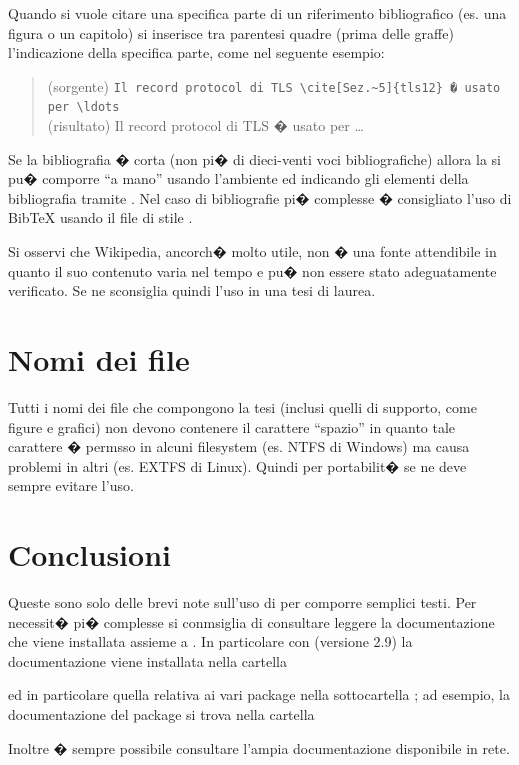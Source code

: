 Quando si vuole citare una specifica parte di un riferimento bibliografico (es. una figura o un capitolo) si inserisce tra parentesi quadre (prima delle graffe) l'indicazione della specifica parte, come nel seguente esempio:
\begin{quote}
(sorgente) \verb+Il record protocol di TLS \cite[Sez.~5]{tls12} � usato per \ldots+
\\
(risultato) Il record protocol di TLS \cite[Sez.~5]{tls12} � usato per \ldots
\end{quote}

Se la bibliografia � corta (non pi� di dieci-venti voci bibliografiche) allora la si pu� comporre ``a mano'' usando l'ambiente  ed indicando gli elementi della bibliografia tramite .
Nel caso di bibliografie pi� complesse � consigliato l'uso di BibTeX usando il file di stile .

Si osservi che Wikipedia, ancorch� molto utile, non � una fonte attendibile in quanto il suo contenuto varia nel tempo e pu� non essere stato adeguatamente verificato.
Se ne sconsiglia quindi l'uso in una tesi di laurea.


\section{Nomi dei file}
Tutti i nomi dei file che compongono la tesi (inclusi quelli di supporto, come figure e grafici) non devono contenere il carattere ``spazio'' in quanto tale carattere � permsso in alcuni filesystem (es. NTFS di Windows) ma causa problemi in altri (es. EXTFS di Linux).
Quindi per portabilit� se ne deve sempre evitare l'uso.


\section{Conclusioni}

Queste sono solo delle brevi note sull'uso di \ltx per comporre semplici testi.
Per necessit� pi� complesse si conmsiglia di consultare leggere la documentazione che viene installata assieme a \ltx.
In particolare con \mik (versione 2.9) la documentazione viene installata nella cartella
\begin{center}
\end{center}
ed in particolare quella relativa ai vari package nella sottocartella ; ad esempio, la documentazione del package  si trova nella cartella
\begin{center}
\end{center}
Inoltre � sempre possibile consultare l'ampia documentazione disponibile in rete.
